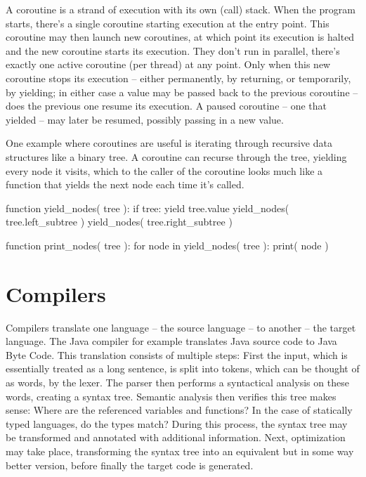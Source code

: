 		A coroutine is a strand of execution with its own (call) stack. When the program starts, there's a single coroutine starting execution at the entry point. This coroutine may then launch new coroutines, at which point its execution is halted and the new coroutine starts its execution. They don't run in parallel, there's exactly one active coroutine (per thread) at any point. Only when this new coroutine stops its execution -- either permanently, by returning, or temporarily, by yielding; in either case a value may be passed back to the previous coroutine -- does the previous one resume its execution. A paused coroutine -- one that yielded -- may later be resumed, possibly passing in a new value.
		
		One example where coroutines are useful is iterating through recursive data structures like a binary tree. A coroutine can recurse through the tree, yielding every node it visits, which to the caller of the coroutine looks much like a function that yields the next node each time it's called.
		
		\begin{codelisting}[caption={Pseudocode of tree iteration using coroutines},morekeywords={function,if,for,in}]
function yield_nodes( tree ):
    if tree:
        yield tree.value
        yield_nodes( tree.left_subtree )
        yield_nodes( tree.right_subtree )

function print_nodes( tree ):
    for node in yield_nodes( tree ):
        print( node )
		\end{codelisting}
	
	\section{Compilers}
	
		Compilers translate one language -- the source language -- to another -- the target language\cite{compilerbau}. The Java compiler for example translates Java source code to Java Byte Code. This translation consists of multiple steps: First the input, which is essentially treated as a long sentence, is split into tokens, which can be thought of as words, by the lexer. The parser then performs a syntactical analysis on these words, creating a syntax tree. Semantic analysis then verifies this tree makes sense: Where are the referenced variables and functions? In the case of statically typed languages, do the types match? During this process, the syntax tree may be transformed and annotated with additional information. Next, optimization may take place, transforming the syntax tree into an equivalent but in some way better version, before finally the target code is generated.

